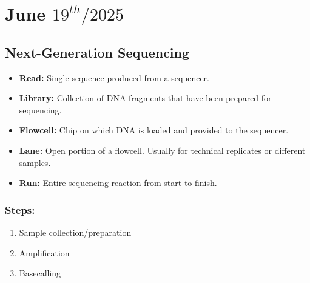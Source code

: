 \documentclass[../main.tex]{subfiles}
\begin{document}
\chapter{June $19^{th} / 2025$}
\label{ch:tufte-design}

\section{Next-Generation Sequencing} \cite{gencore_how_sequencing_works}

\begin{itemize}
    \item \textbf{Read:} Single sequence produced from a sequencer.
    \item \textbf{Library:} Collection of DNA fragments that have been prepared for sequencing.
    \item \textbf{Flowcell:} Chip on which DNA is loaded and provided to the sequencer.
    \item \textbf{Lane:} Open portion of a flowcell. Usually for technical replicates or different samples.
    \item \textbf{Run:} Entire sequencing reaction from start to finish.
\end{itemize}

\subsection*{Steps:} %
\begin{enumerate}
    \item Sample collection/preparation
    \item Amplification
    \item Basecalling
\end{enumerate}
\end{document}
